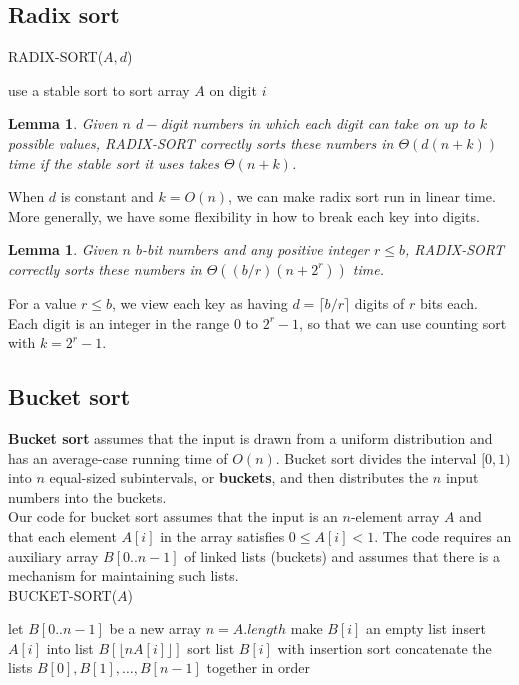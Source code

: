 \documentclass[12pt]{article}
\newtheorem{lemma}[theorem]{Lemma}
\begin{document}
\subsection{Radix sort}

RADIX-SORT($A, d$)
\begin{algorithmic}[1]
	\State use a stable sort to sort array $A$ on digit $i$
\EndFor
\end{algorithmic}

\begin{lemma}
  Given $n$ $d-$digit numbers in which each digit can take on up to $k$ possible values, RADIX-SORT correctly sorts these numbers in $\Theta(d(n+k))$ time if the stable sort it uses takes $\Theta (n+k)$.
\end{lemma}

When $d$ is constant and $k = O(n)$, we can make radix sort run in linear time. More generally, we have some flexibility in how to break each key into digits.

\begin{lemma}
  Given $n$ $b$-bit numbers and any positive integer $r \le b$, RADIX-SORT correctly sorts these numbers in $\Theta ((b/r)(n + 2^r))$ time.
\end{lemma}

For a value $r \le b$, we view each key as having $d = \lceil b/r \rceil$ digits of $r$ bits each. Each digit is an integer in the range $0$ to $2^r-1$, so that we can use counting sort with $k = 2^r -1$.

\subsection{Bucket sort}

\textbf {Bucket sort} assumes that the input is drawn from a uniform distribution and has an average-case running time of $O(n)$. Bucket sort divides the interval $[0,1)$ into $n$ equal-sized subintervals, or \textbf {buckets}, and then distributes the $n$ input numbers into the buckets. \\

Our code for bucket sort assumes that the input is an $n$-element array $A$ and that each element $A[i]$ in the array satisfies $0 \le A[i] < 1$. The code requires an auxiliary array $B[0..n-1]$ of linked lists (buckets) and assumes that there is a mechanism for maintaining such lists. \\

BUCKET-SORT($A$)
\begin{algorithmic}[1]
\State let $B[0..n-1]$ be a new array
\State $n = A.length$
	\State make $B[i]$ an empty list
\EndFor
{}
	\State insert $A[i]$ into list $B[\lfloor nA[i] \rfloor ]$
\EndFor
{}
	\State sort list $B[i]$ with insertion sort
\EndFor
\State concatenate the lists $B[0], B[1], \dots, B[n-1]$ together in order
\end{algorithmic}
\end{document}
